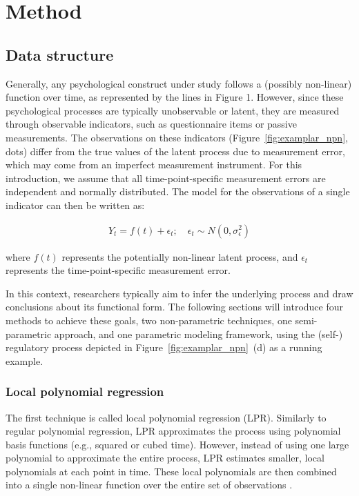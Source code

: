 \documentclass[man, floatsintext]{apa7}
\begin{document}
\section{Method}

\subsection{Data structure}

Generally, any psychological construct under study follows a (possibly
non-linear) function over time, as represented by the lines in Figure 1.
However, since these psychological processes are typically unobservable or
latent, they are measured through observable indicators, such as questionnaire
items or passive measurements. The observations on these indicators
(Figure~\ref{fig:examplar_npn}, dots)
differ from the true values of the latent process due to measurement
error, which may come from an imperfect measurement instrument.
For this introduction, we assume that all time-point-specific measurement
errors are independent and normally distributed. The model for the
observations of a single indicator can then be written as:

\begin{align}
  Y_t = f(t) + \epsilon_t; \quad \epsilon_t \sim N(0, \sigma^2_{\epsilon})
\end{align}

\noindent where $f(t)$ represents the potentially non-linear latent process,
and $\epsilon_t$ represents the time-point-specific measurement error.

In this context, researchers typically aim to infer the underlying process and
draw conclusions about its functional form. The following sections will
introduce four methods to achieve these goals, two non-parametric techniques,
one semi-parametric approach, and one parametric modeling framework, using the
(self-) regulatory process depicted in Figure~\ref{fig:examplar_npn}~(d)
as a running example.

\subsubsection{Local polynomial regression}

The first technique is called local polynomial regression (LPR). Similarly to
regular polynomial regression, LPR approximates the process using polynomial
basis functions (e.g., squared or cubed time). However, instead of using one
large polynomial to approximate the entire process, LPR estimates smaller,
local polynomials at each point in time. These local polynomials are then
combined into a single non-linear function over the entire set of observations
\parencite{fan_adaptive_1995, ruppert_multivariate_1994, fan_local_2018}.
\end{document}
